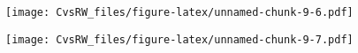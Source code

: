 \documentclass[
]{article}
\newenvironment{Shaded}{\begin{snugshade}}{\end{snugshade}}
\newcommand{\DataTypeTok}[1]{\textcolor[rgb]{0.13,0.29,0.53}{#1}}
\newcommand{\FloatTok}[1]{\textcolor[rgb]{0.00,0.00,0.81}{#1}}
\newcommand{\KeywordTok}[1]{\textcolor[rgb]{0.13,0.29,0.53}{\textbf{#1}}}
\newcommand{\NormalTok}[1]{#1}
\newcommand{\OperatorTok}[1]{\textcolor[rgb]{0.81,0.36,0.00}{\textbf{#1}}}
\newcommand{\StringTok}[1]{\textcolor[rgb]{0.31,0.60,0.02}{#1}}
\begin{document}
\begin{Shaded}
\end{Shaded}

\texttt{[image: CvsRW\_files/figure-latex/unnamed-chunk-9-6.pdf]}

\begin{Shaded}
\end{Shaded}

\texttt{[image: CvsRW\_files/figure-latex/unnamed-chunk-9-7.pdf]}
\end{document}
